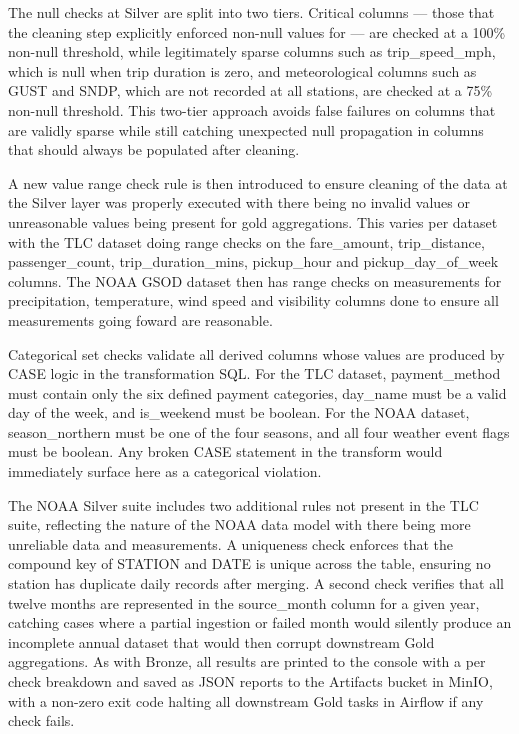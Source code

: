\documentclass[conference]{IEEEtran}
\begin{document}
The null checks at Silver are split into two tiers. Critical columns --- those that the cleaning step explicitly enforced non-null values for ---  are checked at a 100\% non-null threshold, while legitimately sparse columns such as trip\_speed\_mph, which is null when trip duration is zero, and meteorological columns such as GUST and SNDP, which are not recorded at all stations, are checked at a 75\% non-null threshold. This two-tier approach avoids false failures on columns that are validly sparse while still catching unexpected null propagation in columns that should always be populated after cleaning.

A new value range check rule is then introduced to ensure cleaning of the data at the Silver layer was properly executed with there being no invalid values or unreasonable values being present for gold aggregations. This varies per dataset with the TLC dataset doing range checks on the fare\_amount, trip\_distance, passenger\_count, trip\_duration\_mins, pickup\_hour and pickup\_day\_of\_week columns. The NOAA GSOD dataset then has range checks on measurements for precipitation, temperature, wind speed and visibility columns done to ensure all measurements going foward are reasonable.

Categorical set checks validate all derived columns whose values are produced by CASE logic in the transformation SQL. For the TLC dataset, payment\_method must contain only the six defined payment categories, day\_name must be a valid day of the week, and is\_weekend must be boolean. For the NOAA dataset, season\_northern must be one of the four seasons, and all four weather event flags must be boolean. Any broken CASE statement in the transform would immediately surface here as a categorical violation.

The NOAA Silver suite includes two additional rules not present in the TLC suite, reflecting the nature of the NOAA data model with there being more unreliable data and measurements. A uniqueness check enforces that the compound key of STATION and DATE is unique across the table, ensuring no station has duplicate daily records after merging. A second check verifies that all twelve months are represented in the source\_month column for a given year, catching cases where a partial ingestion or failed month would silently produce an incomplete annual dataset that would then corrupt downstream Gold aggregations. As with Bronze, all results are printed to the console with a per check breakdown and saved as JSON reports to the Artifacts bucket in MinIO, with a non-zero exit code halting all downstream Gold tasks in Airflow if any check fails.
\end{document}
